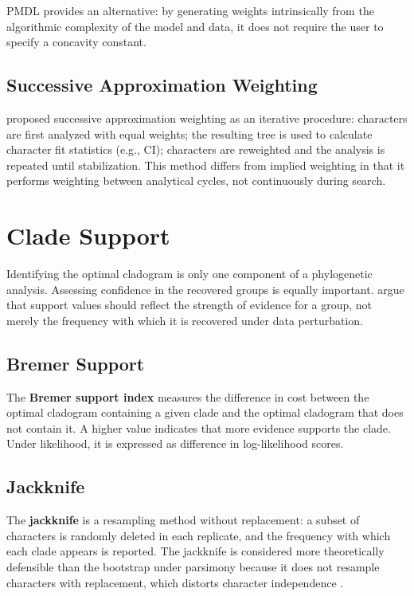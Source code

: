 PMDL \parencite{wheelervaron2025} provides an alternative: by generating weights intrinsically from the algorithmic complexity of the model and data, it does not require the user to specify a concavity constant.

\subsection{Successive Approximation Weighting}

\textcite{farris1969} proposed successive approximation weighting as an iterative procedure: characters are first analyzed with equal weights; the resulting tree is used to calculate character fit statistics (e.g., CI); characters are reweighted and the analysis is repeated until stabilization. This method differs from implied weighting in that it performs weighting between analytical cycles, not continuously during search.

\section{Clade Support}
\label{sec:suporte}

Identifying the optimal cladogram is only one component of a phylogenetic analysis. Assessing confidence in the recovered groups is equally important. \textcite{grantkluge2008} argue that support values should reflect the strength of evidence for a group, not merely the frequency with which it is recovered under data perturbation.

\subsection{Bremer Support}

The \textbf{Bremer support index} \parencite{bremer1988} measures the difference in cost between the optimal cladogram containing a given clade and the optimal cladogram that does not contain it. A higher value indicates that more evidence supports the clade. Under likelihood, it is expressed as difference in log-likelihood scores.

\subsection{Jackknife}

The \textbf{jackknife} \parencite{farrisetal1996} is a resampling method without replacement: a subset of characters is randomly deleted in each replicate, and the frequency with which each clade appears is reported. The jackknife is considered more theoretically defensible than the bootstrap under parsimony because it does not resample characters with replacement, which distorts character independence \parencite{farrisetal1996}.

